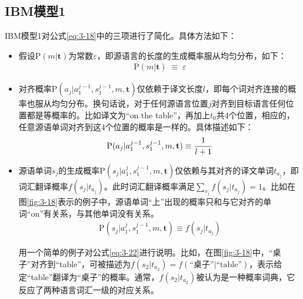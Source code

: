 \subsection{IBM模型1}
\parinterval IBM模型1对公式\ref{eq:3-18}中的三项进行了简化。具体方法如下：

\begin{itemize}
\vspace{0.5em}
\item 假设$\textrm{P}(m|\mathbf{t})$为常数$\varepsilon$，即源语言的长度的生成概率服从均匀分布，如下：
\begin{eqnarray}
\textrm{P}(m|\mathbf{t})\; \equiv \; \varepsilon
\label{eq:3-20}
\end{eqnarray}
\item 对齐概率$\textrm{P}(a_j|a_1^{j-1},s_1^{j-1},m,\mathbf{t})$仅依赖于译文长度$l$，即每个词对齐连接的概率也服从均匀分布。换句话说，对于任何源语言位置$j$对齐到目标语言任何位置都是等概率的。比如译文为``on the table''，再加上$t_0$共4个位置，相应的，任意源语单词对齐到这4个位置的概率是一样的。具体描述如下：
\begin{eqnarray}
\textrm{P}(a_j|a_1^{j-1},s_1^{j-1},m,\mathbf{t}) \equiv \frac{1}{l+1}
\label{eq:3-21}
\vspace{0.5em}
\end{eqnarray}

\item 源语单词$s_j$的生成概率$\textrm{P}(s_j|a_1^{j},s_1^{j-1},m,\mathbf{t})$仅依赖与其对齐的译文单词$t_{a_j}$，即词汇翻译概率$f(s_j|t_{a_j})$。此时词汇翻译概率满足$\sum_{s_j}{f(s_j|t_{a_j})}=1$。比如在图\ref{fig:3-18}表示的例子中，源语单词``上''出现的概率只和与它对齐的单词``on''有关系，与其他单词没有关系。
\begin{eqnarray}
\textrm{P}(s_j|a_1^{j},s_1^{j-1},m,\mathbf{t}) \equiv f(s_j|t_{a_j})
\label{eq:3-22}
\end{eqnarray}

用一个简单的例子对公式\ref{eq:3-22}进行说明。比如，在图\ref{fig:3-18}中，``桌子''对齐到``table''，可被描述为$f(s_2 |t_{a_2})=f(\textrm{``桌子''}|\textrm{``table''})$，表示给定``table''翻译为``桌子''的概率。通常，$f(s_2 |t_{a_2})$被认为是一种概率词典，它反应了两种语言词汇一级的对应关系。
\end{itemize}

